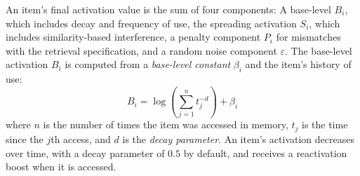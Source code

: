 \documentclass{cambridge7A}\usepackage[]{graphicx}\usepackage[]{color}
\begin{document}
An item's final activation value is the sum of four components: A base-level $B_i$, which includes decay and frequency of use, the spreading activation $S_i$, which includes similarity-based interference, a penalty component $P_i$ for mismatches with the retrieval specification, and a random noise component $\varepsilon$.
The base-level activation $B_i$ is computed from a \textit{base-level constant} $\beta_i$ and the item's history of use:
\begin{equation}\label{eq:base}
	B_i = \log\left (\sum_{j=1}^n t_j^{-d}\right) + \beta_i
\end{equation}
where $n$ is the number of times the item was accessed in memory, $t_j$ is the time since the $j$th access, and $d$ is the \textit{decay parameter}. An item's activation decreases over time, with a decay parameter of $0.5$ by default, and receives a reactivation boost when it is accessed. 
\end{document}
